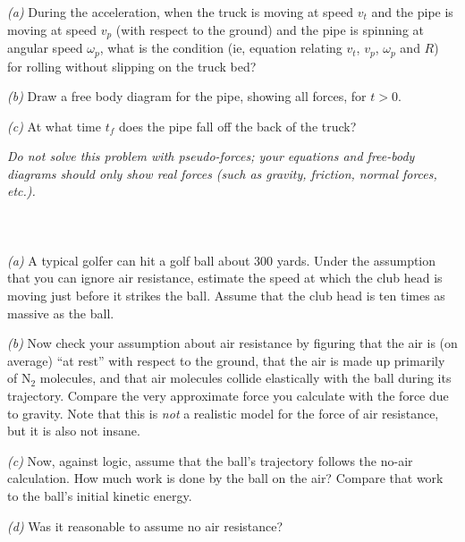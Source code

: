 \documentclass[12pt]{article}
\newcounter{problem}
\begin{document}
\textsl{(a)} During the acceleration, when the truck is moving at
speed $v_t$ and the pipe is moving at speed $v_p$ (with respect to the
ground) and the pipe is spinning at angular speed $\omega_p$, what is
the condition (ie, equation relating $v_t$, $v_p$, $\omega_p$ and $R$)
for rolling without slipping on the truck bed?

\textsl{(b)} Draw a free body diagram for the pipe, showing all
forces, for $t>0$.

\textsl{(c)} At what time $t_f$ does the pipe fall off the back of the
truck?

\emph{Do not solve this problem with pseudo-forces; your equations and
free-body diagrams should only show real forces (such as gravity,
friction, normal forces, etc.).}

\paragraph{\problemname~\theproblem}

\textsl{(a)} A typical golfer can hit a golf ball about 300 yards.
Under the assumption that you can ignore air resistance, estimate the
speed at which the club head is moving just before it strikes the
ball.  Assume that the club head is ten times as massive as the ball.

\textsl{(b)} Now check your assumption about air resistance by
figuring that the air is (on average) ``at rest'' with respect to the
ground, that the air is made up primarily of $\mathrm{N}_2$ molecules,
and that air molecules collide elastically with the ball during its
trajectory.  Compare the very approximate force you calculate with the
force due to gravity.  Note that this is \emph{not} a realistic model
for the force of air resistance, but it is also not insane.

\textsl{(c)} Now, against logic, assume that the ball's trajectory
follows the no-air calculation.  How much work is done by the ball on
the air?  Compare that work to the ball's initial kinetic energy.

\textsl{(d)} Was it reasonable to assume no air resistance?

\paragraph{\problemname~\theproblem}
\end{document}
